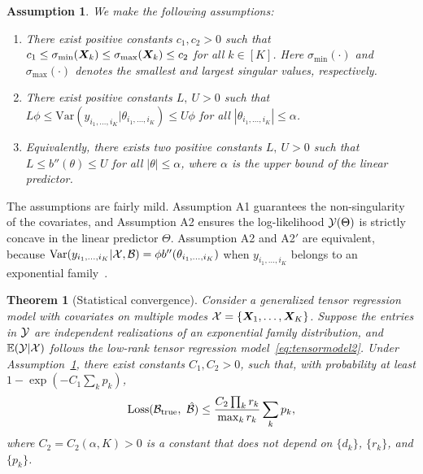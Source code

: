 \documentclass{article}
\theoremstyle{plain}
\newtheorem{thm}{Theorem}[section]
\newtheorem{assumption}{Assumption}
\theoremstyle{definition}
\begin{document}
\begin{assumption}\label{ass}We make the following assumptions:
\begin{enumerate}[itemsep=0pt,topsep=0pt,leftmargin=*,partopsep=0pt]
\item [A1.] There exist positive constants $c_1, c_2>0$ such that $c_1\leq \sigma_{\min}(\bm X_k)\leq  \sigma_{\max}(\bm X_k)\leq c_2$ for all $k\in[K]$. Here $\sigma_{\text{min}}(\cdot)$ and $\sigma_{\text{max}}(\cdot)$ denotes the smallest and largest singular values, respectively.
\item [A2.] There exist positive constants $L,\ U>0$ such that $L\phi \leq \text{Var}(y_{i_1,\ldots,i_K}|\theta_{i_1,\ldots,i_K})\leq U\phi $ for all $|\theta_{i_1,\ldots,i_K}|\leq \alpha$.
\item[A2$'$.] Equivalently, there exists two positive constants $L,\ U>0$ such that $L\leq b''(\theta) \leq U$ for all $|\theta|\leq \alpha$, where $\alpha$ is the upper bound of the linear predictor. 

\end{enumerate}
\end{assumption}
The assumptions are fairly mild. Assumption A1 guarantees the non-singularity of the covariates, and Assumption A2 ensures the log-likelihood $\mathcal{Y}(\Theta)$ is strictly concave in the linear predictor $\Theta$. Assumption A2 and A2$'$ are equivalent, because $\text{Var}(y_{i_1,\ldots,i_K}|\mathcal{X},\mathcal{B})=\phi b''(\theta_{i_1,\ldots,i_K})$ when $y_{i_1,\ldots,i_K}$ belongs to an exponential family~\cite{mccullagh1989generalized}. 

\vspace{.1cm}  
\begin{thm}[Statistical convergence]\label{thm:main}
Consider a generalized tensor regression model with covariates on multiple modes $\mathcal{X}=\{\bm X_1,\ldots,\bm X_K\}$. Suppose the entries in $\mathcal{Y}$ are independent realizations of an exponential family distribution, and $\mathbb{E}(\mathcal{Y}|\mathcal{X})$ follows the low-rank tensor regression model~\eqref{eq:tensormodel2}. Under Assumption~\ref{ass}, there exist constants $C_1, C_2>0$, such that, with probability at least $1-\exp(-C_1\sum_k p_k)$, 
\vspace{-.05cm}
\begin{equation}\label{eq:bound}
\text{Loss}(\mathcal{B}_{\text{true}},\ \hat {\mathcal{B}}) \leq \frac{ C_{2}\prod_kr_k}{\max_k r_k}\sum_{k} p_{k},
\end{equation}
where $C_2=C_2(\alpha, K)>0$ is a constant that does not depend on $\{d_k\}$, $\{r_k\}$, and $\{p_k\}$. 
\end{thm}
\end{document}
